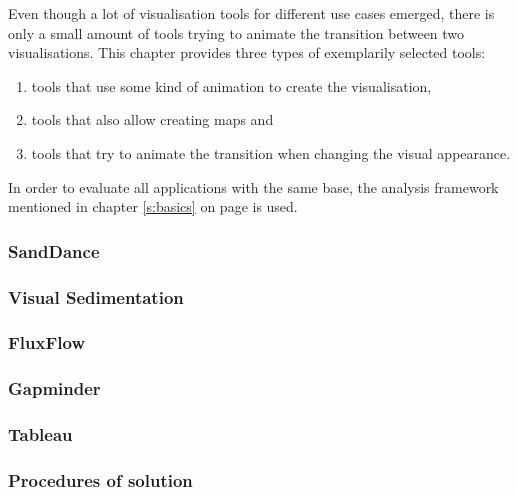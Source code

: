 Even though a lot of visualisation tools for different use cases emerged, there is only a small amount of tools trying to animate the transition between two visualisations. This chapter provides three types of exemplarily selected tools:

\begin{enumerate}
\item tools that use some kind of animation to create the visualisation,
\item tools that also allow creating maps and
\item tools that try to animate the transition when changing the visual appearance.
\end{enumerate}

In order to evaluate all applications with the same base, the analysis framework mentioned in chapter \ref{s:basics} on page \pageref{s:basics} is used.

\subsubsection{SandDance}


\subsubsection{Visual Sedimentation}


\subsubsection{FluxFlow}


\subsubsection{Gapminder}


\subsubsection{Tableau}


\subsubsection{Procedures of solution}
\label{s:theoretical-contrib}
